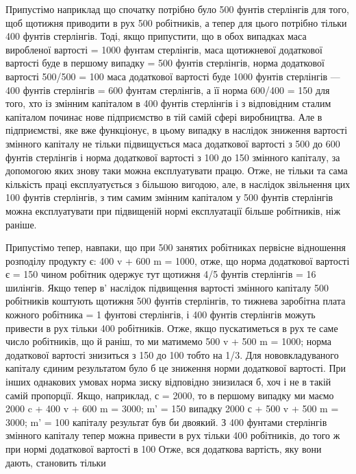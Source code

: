 Припустімо наприклад що спочатку потрібно було 500 фунтів
стерлінгів для того, щоб щотижня приводити в рух 500 робітників, а тепер для цього потрібно тільки
400 фунтів стерлінгів.
Тоді, якщо припустити, що в обох випадках маса виробленої
вартості = 1000 фунтам стерлінгів, маса щотижневої додаткової вартості буде в першому випадку = 500
фунтів стерлінгів, норма додаткової вартості 500/500 = 100%
маса додаткової вартості буде 1000 фунтів стерлінгів — 400 фунтів стерлінгів = 600 фунтам
стерлінгів, а її норма 600/400 = 150%
для того, хто із змінним капіталом в 400 фунтів стерлінгів і з відповідним сталим капіталом починає
нове підприємство в тій самій сфері виробництва. Але в підприємстві, яке вже функціонує, в цьому
випадку в наслідок зниження вартості змінного
капіталу не тільки підвищується маса додаткової вартості з 500
до 600 фунтів стерлінгів і норма додаткової вартості з 100
до 150%
змінного капіталу, за допомогою яких знову таки можна експлуатувати працю. Отже, не тільки та сама
кількість праці експлуатується з більшою вигодою, але, в наслідок звільнення цих 100 фунтів
стерлінгів, з тим самим змінним капіталом у 500 фунтів стерлінгів можна експлуатувати при підвищеній
нормі експлуатації більше робітників, ніж раніше.

Припустімо тепер, навпаки, що при 500 занятих робітниках
первісне відношення розподілу продукту є: 400 v + 600 m = 1000, отже, що норма додаткової вартості є
= 150%
чином робітник одержує тут щотижня 4/5 фунтів стерлінгів = 16 шилінгів. Якщо тепер в' наслідок
підвищення вартості
змінного капіталу 500 робітників коштують щотижня 500 фунтів
стерлінгів, то тижнева заробітна плата кожного робітника = 1 фунтові стерлінгів, і 400 фунтів
стерлінгів можуть привести
в рух тільки 400 робітників. Отже, якщо пускатиметься в рух те
саме число робітників, що й раніш, то ми матимемо 500 v + 500 m = 1000; норма додаткової вартості
знизиться з 150 до 100%
тобто на 1/3. Для нововкладуваного капіталу єдиним результатом було б це зниження норми додаткової
вартості. При інших
однакових умовах норма зиску відповідно знизилася б, хоч і не
в такій самій пропорції. Якщо, наприклад, с = 2000, то в
першому випадку ми маємо 2000 c + 400 v + 600 m = 3000; m' = 150%
випадку 2000 с + 500 v + 500 m = 3000; m' = 100%
капіталу результат був би двоякий. З 400 фунтами
стерлінгів змінного капіталу тепер можна привести в рух тільки
400 робітників, до того ж при нормі додаткової вартості в 100%
Отже, вся додаткова вартість, яку вони дають, становить тільки
